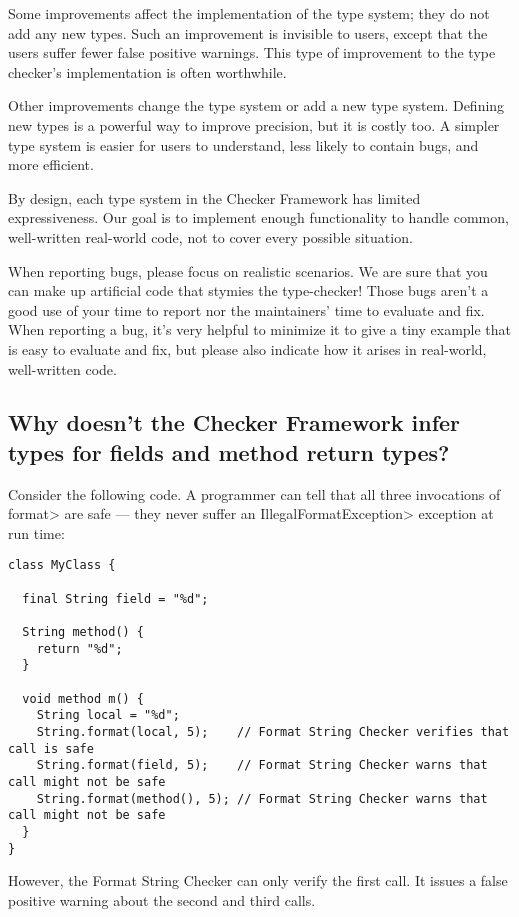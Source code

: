 Some improvements affect the implementation of the type system; they do not
add any new types.  Such an improvement is invisible to users, except that
the users suffer fewer false positive warnings.  This type of improvement
to the type checker's implementation is often worthwhile.

Other improvements change the type system or add a new type system.
Defining new types is a powerful way to improve precision, but it is costly
too.  A simpler type system is easier for users to understand, less likely
to contain bugs, and more efficient.

By design, each type system in the Checker Framework has limited
expressiveness.  Our goal is to implement enough functionality to handle
common, well-written real-world code, not to cover every possible
situation.

When reporting bugs, please focus on realistic scenarios.  We are sure that
you can make up artificial code that stymies the type-checker!  Those bugs
aren't a good use of your time to report nor the maintainers' time to
evaluate and fix.  When reporting a bug, it's very helpful to minimize it
to give a tiny example that is easy to evaluate and fix, but please also
indicate how it arises in real-world, well-written code.


\subsection{Why doesn't the Checker Framework infer types for fields and method return types?\label{faq-infer-fields}}

Consider the following code.  A programmer can tell that all three
invocations of \<format> are safe --- they never suffer an
\<IllegalFormatException> exception at run time:

\begin{Verbatim}
class MyClass {

  final String field = "%d";

  String method() {
    return "%d";
  }

  void method m() {
    String local = "%d";
    String.format(local, 5);    // Format String Checker verifies that call is safe
    String.format(field, 5);    // Format String Checker warns that call might not be safe
    String.format(method(), 5); // Format String Checker warns that call might not be safe
  }
}
\end{Verbatim}

\noindent
However, the Format String Checker can only verify the first call.  It issues a
false positive warning about the second and third calls.

